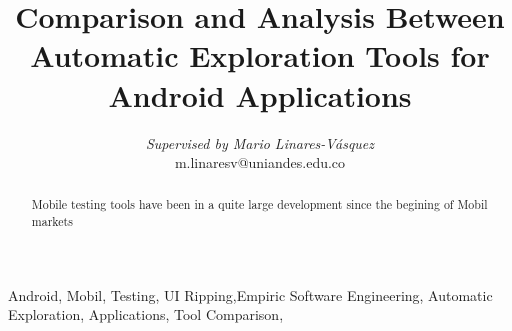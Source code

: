 \documentclass[conference]{IEEEtran}
\begin{document}
\title{Comparison and Analysis Between Automatic Exploration Tools for Android Applications}

\author{
\textit{Supervised by Mario Linares-Vásquez}\\
{m.linaresv@uniandes.edu.co}
}

\maketitle

\begin{IEEEkeywords}
Android, Mobil, Testing, UI Ripping,Empiric Software Engineering, Automatic Exploration, Applications, Tool Comparison, 
\end{IEEEkeywords}

\begin{abstract}
Mobile testing tools have been in a quite large development since the begining of Mobil markets
\end{abstract}









\end{document}
